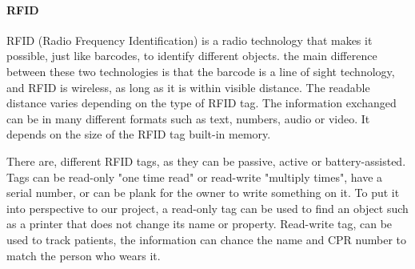\paragraph{RFID}
RFID (Radio Frequency Identification) is a radio technology that makes it possible, just like barcodes, to identify different objects. the main difference between these two technologies is that the barcode is a line of sight technology, and RFID is wireless, as long as it is within visible distance. The readable distance varies depending on the type of RFID tag. The information exchanged can be in many different formats such as text, numbers, audio or video. It depends on the size of the RFID tag built-in memory. 

There are, different RFID tags, as they can be passive, active or battery-assisted. Tags can be read-only "one time read" or read-write "multiply times", have a serial number, or can be plank for the owner to write something on it. To put it into perspective to our project, a read-only tag can be used to find an object such as a printer that does not change its name or property. Read-write tag, can be used to track patients, the information can chance the name and CPR number to match the person who wears it.  
